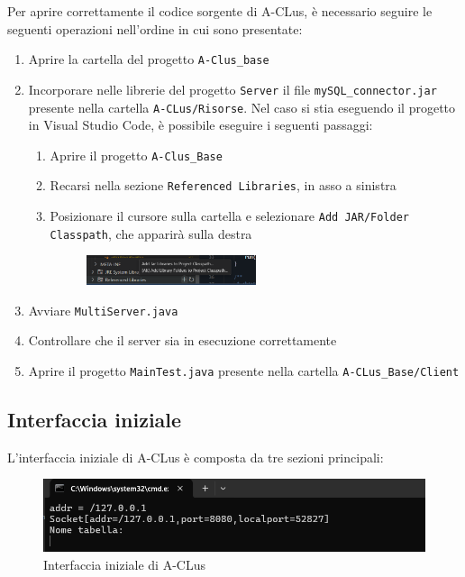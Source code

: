 Per aprire correttamente il codice sorgente di A-CLus, è necessario seguire le seguenti operazioni nell'ordine in cui sono presentate:

\begin{enumerate}
    \item Aprire la cartella del progetto \texttt{A-Clus\_base}
    \item Incorporare nelle librerie del progetto \texttt{Server} il file \texttt{mySQL\_connector.jar} presente nella cartella \texttt{A-CLus/Risorse}. Nel caso si stia eseguendo il progetto in Visual Studio Code, è possibile eseguire i seguenti passaggi:
    \begin{enumerate}
        \item Aprire il progetto \texttt{A-Clus\_Base}
        \item Recarsi nella sezione \texttt{Referenced Libraries}, in asso a sinistra
        \item Posizionare il cursore sulla cartella e selezionare \texttt{Add JAR/Folder Classpath}, che apparirà sulla destra
        \begin{figure}[h!]
            \centering
            \includegraphics[width=0.5\textwidth]{images/refenereziare il jdbc.png}
        \end{figure}
    \end{enumerate}
    \item Avviare \texttt{MultiServer.java}
    \item Controllare che il server sia in esecuzione correttamente
    \item Aprire il progetto \texttt{MainTest.java} presente nella cartella \texttt{A-CLus\_Base/Client}
\end{enumerate}

\subsection{Interfaccia iniziale}

L'interfaccia iniziale di A-CLus è composta da tre sezioni principali:

\begin{figure}[h!]
    \centering
    \includegraphics[width=\textwidth]{images/client in esecuzione.png}
    \caption{Interfaccia iniziale di A-CLus}
\end{figure}

